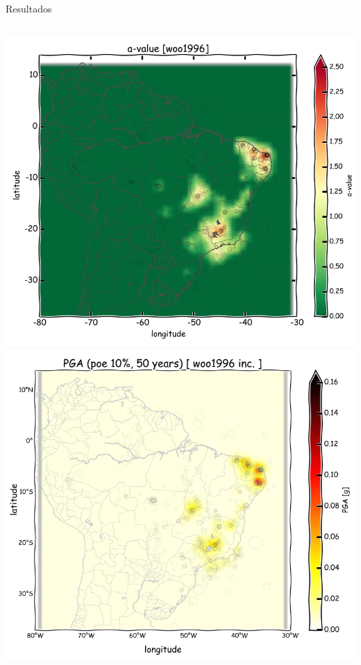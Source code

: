 \documentclass[ucs,8pt]{beamer}
\begin{document}
\begin{frame}{Resultados}
\begin{columns}
	\begin{column}[T]{.24\textwidth}
		\includegraphics[width=1\textwidth]{a_woo} \\
		\includegraphics[width=1\textwidth]{pga_woo_inc}
	\end{column}
	

\end{columns}
\end{frame}
\end{document}
